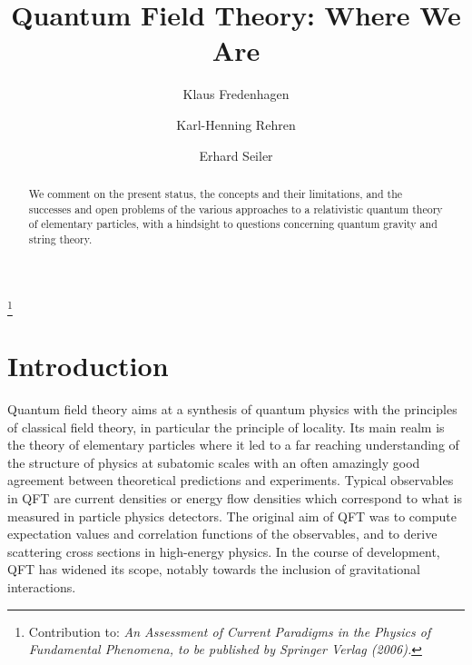 \documentclass[multphys,vecphys]{svmult}
\begin{document}
\title*{\bf Quantum Field Theory: Where We Are}
\author{{Klaus Fredenhagen}\and
{Karl-Henning Rehren}\and
{Erhard Seiler}}



\maketitle



\vskip10mm
\begin{abstract}  We comment on the present status, the
  concepts and their limitations, and the successes and open problems 
  of the various approaches to a relativistic quantum theory of elementary 
  particles, with a hindsight to questions concerning quantum gravity and 
  string theory. 
\end{abstract}
\vskip36mm

\renewcommand{\thefootnote}{} %

\footnote{Contribution to: \it An Assessment of Current Paradigms in
  the Physics of Fundamental Phenomena, \rm to be published by
  Springer Verlag (2006).} 
\section{Introduction}

Quantum field theory aims at a synthesis of quantum physics with the 
principles of classical field theory, in particular the principle of
locality. Its main realm is the theory of elementary
particles where it led to a far reaching understanding of the
structure of physics at subatomic scales with an often amazingly good
agreement between theoretical predictions and experiments.  
Typical observables in QFT are current densities or energy flow densities
which correspond to what is measured in particle physics detectors.
The original aim of QFT was to compute expectation values and correlation 
functions of the observables, and to derive scattering 
cross sections in high-energy physics. In the
course of development, QFT has widened its scope, notably towards the
inclusion of gravitational interactions. 
\end{document}

